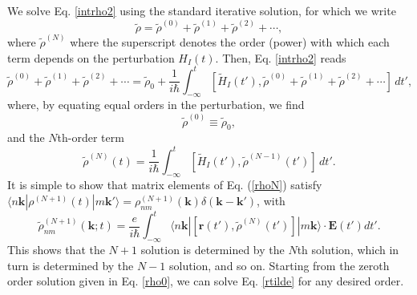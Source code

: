 We solve Eq. \eqref{intrho2} using the standard iterative
solution, for which we write
\begin{equation}\label{rhop}
\tilde{\rho}
= \tilde{\rho}^{(0)}
+ \tilde{\rho}^{(1)}
+ \tilde{\rho}^{(2)}
+ \cdots,
\end{equation}
where $\tilde{\rho}^{(N)}$ where the superscript denotes the order (power) with
which each term depends on the perturbation $H_{I}(t)$. Then, Eq.
\eqref{intrho2} reads
\begin{equation}\label{intrho3}
  \tilde{\rho}^{(0)} 
+ \tilde{\rho}^{(1)} 
+ \tilde{\rho}^{(2)} 
+ \cdots
= \tilde{\rho}_{0}
+ \frac{1}{i\hbar}\int_{-\infty}^{t} 
  \left[
  \tilde{H}_{I}(t'),\tilde{\rho}^{(0)}+\tilde{\rho}^{(1)}+\tilde{\rho}^{(2)}
  + \cdots
  \right]\,dt',
\end{equation}
where, by equating equal orders in the perturbation, we find
\begin{equation}\label{rho0}
\tilde{\rho}^{(0)}\equiv\tilde{\rho}_{0},
\end{equation}
and the $N$th-order term
\begin{equation}\label{rhoN}
\tilde{\rho}^{(N)}(t)=
\frac{1}{i\hbar}
\int_{-\infty}^{t}
\left[\tilde{H}_{I}(t'),\tilde{\rho}^{(N-1)}(t')\right]\,dt'.
\end{equation}
It is simple to show that matrix elements of Eq. (\ref{rhoN}) satisfy 
$\langle n\mathbf{k}| \rho^{(N+1)}(t) |m\mathbf{k}'\rangle =
\rho^{(N+1)}_{nm}(\mathbf{k})\delta(\mathbf{k}-\mathbf{k}')$, with
\begin{equation}\label{rtilde}
\tilde{\rho}^{(N+1)}_{nm}(\mathbf{k};t)
= \frac{e}{i\hbar}\int_{-\infty}^t
\langle n\mathbf{k}|
\left[\mathbf{r}(t'),\tilde{\rho}^{(N)}(t')\right]
|m\mathbf{k}\rangle
\cdot\mathbf{E}(t')dt'.
\end{equation}
This shows that the $N + 1$ solution is determined by the $N$th solution, which
in turn is determined by the $N - 1$ solution, and so on. Starting from the
zeroth order solution given in Eq. \eqref{rho0}, we can solve Eq. \eqref{rtilde}
for any desired order.

